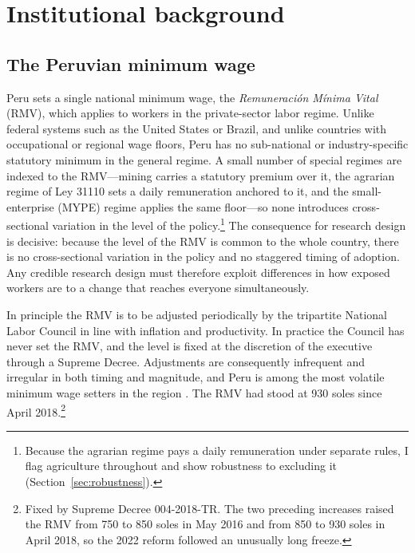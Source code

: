 \section{Institutional background}\label{sec:institutional}

\subsection{The Peruvian minimum wage}

Peru sets a single national minimum wage, the \emph{Remuneración Mínima Vital}
(RMV), which applies to workers in the private-sector labor regime. Unlike federal
systems such as the United States or Brazil, and unlike countries with occupational
or regional wage floors, Peru has no sub-national or industry-specific statutory
minimum in the general regime. A small number of special regimes are indexed to the
RMV---mining carries a statutory premium over it, the agrarian regime of Ley 31110 sets
a daily remuneration anchored to it, and the small-enterprise (MYPE) regime applies the
same floor---so none introduces cross-sectional variation in the level of the
policy.\footnote{Because the agrarian regime pays a daily remuneration under separate
rules, I flag agriculture throughout and show robustness to excluding it
(Section~\ref{sec:robustness}).} The consequence for
research design is decisive: because the level of the RMV is common to the whole
country, there is no cross-sectional variation in the policy and no staggered timing
of adoption. Any credible research design must therefore exploit differences in how
exposed workers are to a change that reaches everyone simultaneously.

In principle the RMV is to be adjusted periodically by the tripartite National Labor
Council in line with inflation and productivity. In practice the Council has never
set the RMV, and the level is fixed at the discretion of the executive through a
Supreme Decree. Adjustments are consequently infrequent and irregular in both timing
and magnitude, and Peru is among the most volatile minimum wage setters in the
region \citep{jimenez_2023, cespedes_2005}. The RMV had stood at 930 soles since
April 2018.\footnote{Fixed by Supreme Decree 004-2018-TR. The two preceding increases raised
the RMV from 750 to 850 soles in May 2016 and from 850 to 930 soles in April 2018, so the
2022 reform followed an unusually long freeze.}

